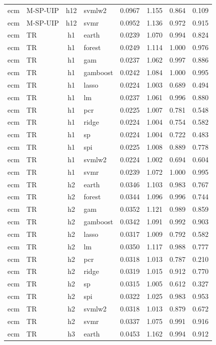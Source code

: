 \begin{ThreePartTable}
\begin{longtable}[t]{llclcccc}
ecm & M-SP-UIP & h12 & svmlw2 & 0.0967 & 1.155 & 0.864 & 0.109\\
ecm & M-SP-UIP & h12 & svmr & 0.0952 & 1.136 & 0.972 & 0.915\\
\addlinespace
ecm & TR & h1 & earth & 0.0239 & 1.070 & 0.994 & 0.824\\
ecm & TR & h1 & forest & 0.0249 & 1.114 & 1.000 & 0.976\\
ecm & TR & h1 & gam & 0.0237 & 1.062 & 0.997 & 0.886\\
ecm & TR & h1 & gamboost & 0.0242 & 1.084 & 1.000 & 0.995\\
ecm & TR & h1 & lasso & 0.0224 & 1.003 & 0.689 & 0.494\\
ecm & TR & h1 & lm & 0.0237 & 1.061 & 0.996 & 0.880\\
ecm & TR & h1 & pcr & 0.0225 & 1.007 & 0.781 & 0.548\\
ecm & TR & h1 & ridge & 0.0224 & 1.004 & 0.754 & 0.582\\
ecm & TR & h1 & sp & 0.0224 & 1.004 & 0.722 & 0.483\\
ecm & TR & h1 & spi & 0.0225 & 1.008 & 0.889 & 0.778\\
ecm & TR & h1 & svmlw2 & 0.0224 & 1.002 & 0.694 & 0.604\\
ecm & TR & h1 & svmr & 0.0239 & 1.072 & 1.000 & 0.995\\
\addlinespace
ecm & TR & h2 & earth & 0.0346 & 1.103 & 0.983 & 0.767\\
ecm & TR & h2 & forest & 0.0344 & 1.096 & 0.996 & 0.744\\
ecm & TR & h2 & gam & 0.0352 & 1.121 & 0.989 & 0.859\\
ecm & TR & h2 & gamboost & 0.0342 & 1.091 & 0.992 & 0.903\\
ecm & TR & h2 & lasso & 0.0317 & 1.009 & 0.792 & 0.582\\
ecm & TR & h2 & lm & 0.0350 & 1.117 & 0.988 & 0.777\\
ecm & TR & h2 & pcr & 0.0318 & 1.013 & 0.787 & 0.210\\
ecm & TR & h2 & ridge & 0.0319 & 1.015 & 0.912 & 0.770\\
ecm & TR & h2 & sp & 0.0315 & 1.005 & 0.612 & 0.327\\
ecm & TR & h2 & spi & 0.0322 & 1.025 & 0.983 & 0.953\\
ecm & TR & h2 & svmlw2 & 0.0318 & 1.013 & 0.879 & 0.672\\
ecm & TR & h2 & svmr & 0.0337 & 1.075 & 0.991 & 0.916\\
\addlinespace
ecm & TR & h3 & earth & 0.0453 & 1.162 & 0.994 & 0.912\\

\end{longtable}
\end{ThreePartTable}
